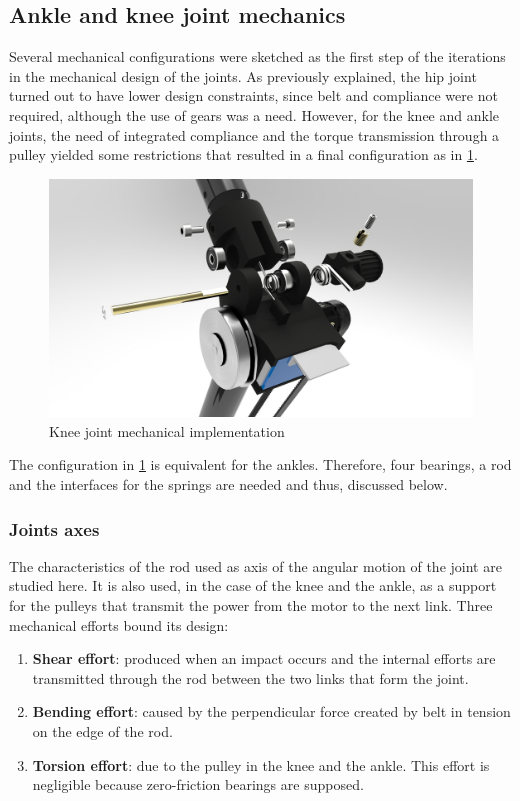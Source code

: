 
\subsection{Ankle and knee joint mechanics} %
\label{sub:hip_and_knee_joint_mechanics}
Several mechanical configurations were sketched as the first step of the iterations in the mechanical design of the joints.
As previously explained, the hip joint turned out to have lower design constraints, since belt and compliance were not required, although the use of gears was a need.
However, for the knee and ankle joints, the need of integrated compliance and the torque transmission through a pulley yielded some restrictions that resulted in a final configuration as in \ref{fig:knee_joint}.

\begin{figure}[h]
  \centering
  \includegraphics[width=\textwidth]{figures/legs_knee_deconstructed.jpg}
  \caption{Knee joint mechanical implementation}
  \label{fig:knee_joint}
\end{figure}

The configuration in \ref{fig:knee_joint} is equivalent for the ankles.
Therefore, four bearings, a rod and the interfaces for the springs are needed and thus, discussed below.

\subsubsection{Joints axes} %
\label{ssub:rods}
The characteristics of the rod used as axis of the angular motion of the joint are studied here.
It is also used, in the case of the knee and the ankle, as a support for the pulleys that transmit the power from the motor to the next link.
Three mechanical efforts bound its design:
\begin{enumerate}
  \item \textbf{Shear effort}: produced when an impact occurs and the internal efforts are transmitted through the rod between the two links that form the joint.
  \item \textbf{Bending effort}: caused by the perpendicular force created by belt in tension on the edge of the rod.
  \item \textbf{Torsion effort}: due to the pulley in the knee and the ankle. 
  This effort is negligible because zero-friction bearings are supposed.
\end{enumerate}

